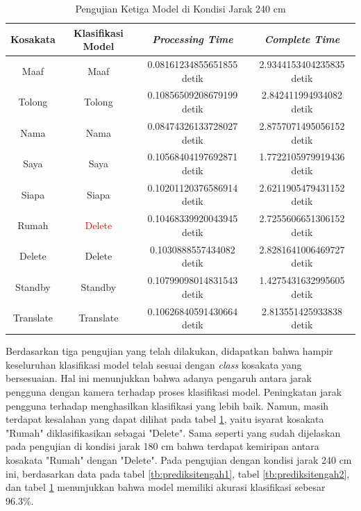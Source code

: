 \begin{longtable}{|c|c|c|c|}
  \caption{Pengujian Ketiga Model di Kondisi Jarak 240 cm}
  \label{tb:prediksitengah3}                                   \\
  \hline
  \rowcolor[HTML]{C0C0C0}
  \textbf{Kosakata} & \textbf{Klasifikasi Model} & \textbf{\emph{Processing Time}} & \textbf{\emph{Complete Time}}\\
  \hline
  Maaf              & Maaf                          & 0.08161234855651855 detik                           & 2.9344153404235835 detik                                  \\
  Tolong            & Tolong                        & 0.10856509208679199 detik                           & 2.842411994934082 detik                                 \\
  Nama              & Nama                          & 0.08474326133728027 detik                           & 2.8757071495056152 detik                                  \\
  Saya              & Saya                          & 0.10568404197692871 detik                           & 1.7722105979919436 detik                                  \\
  Siapa              & Siapa                        & 0.10201120376586914 detik                           & 2.6211905479431152 detik                                  \\
  Rumah             & \textcolor{red}{Delete}       & 0.10468339920043945 detik                           & 2.7255606651306152 detik                                  \\
  Delete            & Delete                        & 0.1030888557434082 detik                            & 2.8281641006469727 detik                                  \\
  Standby           & Standby                       & 0.10799098014831543 detik                           & 1.4275431632995605 detik                                  \\
  Translate         & Translate                     & 0.10626840591430664 detik                           & 2.813551425933838 detik                                 \\
  \hline
\end{longtable}

Berdasarkan tiga pengujian yang telah dilakukan, didapatkan bahwa hampir keseluruhan klasifikasi model telah sesuai dengan \emph{class} kosakata yang bersesuaian. Hal ini menunjukkan bahwa adanya pengaruh antara jarak pengguna dengan kamera terhadap proses klasifikasi model. Peningkatan jarak pengguna terhadap menghasilkan klasifikasi yang lebih baik. Namun, masih terdapat kesalahan yang dapat dilihat pada tabel \ref{tb:prediksitengah3}, yaitu isyarat kosakata "Rumah" diklasifikasikan sebagai "Delete". Sama seperti yang sudah dijelaskan pada pengujian di kondisi jarak 180 cm bahwa terdapat kemiripan antara kosakata "Rumah" dengan "Delete". Pada pengujian dengan kondisi jarak 240 cm ini, berdasarkan data pada tabel \ref{tb:prediksitengah1}, tabel \ref{tb:prediksitengah2}, dan tabel \ref{tb:prediksitengah3} menunjukkan bahwa model memiliki akurasi klasifikasi sebesar 96.3\%.

